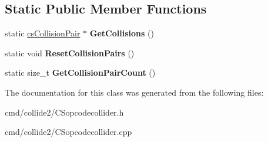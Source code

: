 \subsection*{Static Public Member Functions}
\begin{DoxyCompactItemize}
\item 
static \hyperlink{structcsCollisionPair}{cs\+Collision\+Pair} $\ast$ {\bfseries Get\+Collisions} ()\hypertarget{classcsOPCODECollider_a521fa2626ffc384ae47ddbc5426135dc}{}\label{classcsOPCODECollider_a521fa2626ffc384ae47ddbc5426135dc}

\item 
static void {\bfseries Reset\+Collision\+Pairs} ()\hypertarget{classcsOPCODECollider_a235d48cf9ff05c26b62edae6ed9a3090}{}\label{classcsOPCODECollider_a235d48cf9ff05c26b62edae6ed9a3090}

\item 
static size\+\_\+t {\bfseries Get\+Collision\+Pair\+Count} ()\hypertarget{classcsOPCODECollider_a43b9d13b5036508c1213f59437787aa7}{}\label{classcsOPCODECollider_a43b9d13b5036508c1213f59437787aa7}

\end{DoxyCompactItemize}


The documentation for this class was generated from the following files\+:\begin{DoxyCompactItemize}
\item 
cmd/collide2/C\+Sopcodecollider.\+h\item 
cmd/collide2/C\+Sopcodecollider.\+cpp\end{DoxyCompactItemize}
